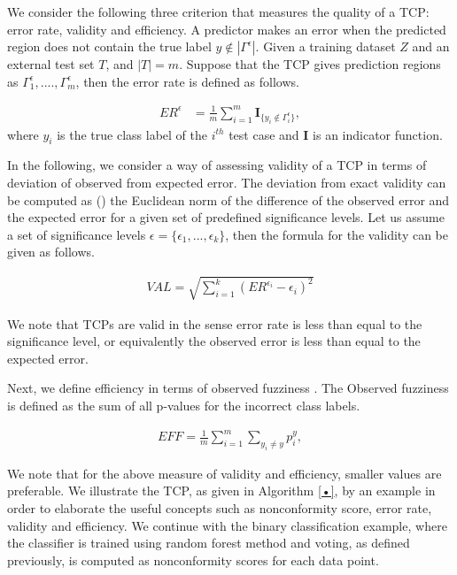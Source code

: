 \documentclass[main]{subfiles}
\begin{document}
We consider the following three criterion that measures the quality of a TCP: error rate,
validity and efficiency. A predictor makes an error when the predicted region does not contain the true label $ y \not\in |\Gamma^{\epsilon}|$. Given a training dataset $Z$ and an external test set $T$,  and $|T| = m$. Suppose that the TCP gives prediction regions as $\Gamma_1^{\epsilon}, ...., \Gamma_m^{\epsilon}$, then the error rate is defined as follows.

\begin{definition}
\begin{align} \label{eq:errorRate}
		ER^{\epsilon} &= \frac{ 1}{m} \sum\limits_{i=1}^{m} \textbf{I}_{ \{y_i \not\in \Gamma_i^{\epsilon} \} },		
\end{align}	
where $y_i$ is the true class label of the $i^{th}$ test case and $\textbf{I}$ is an indicator function. 	
\end{definition}
In the following, we consider a way of assessing validity of a TCP in terms of deviation of observed from expected error. The deviation from exact validity can be computed as (\cite{carlsson2017comparing}) the Euclidean norm of the difference of the observed error and the expected error for a given set of predefined significance levels. Let us assume a set of significance levels $\epsilon = \{ \epsilon_1, ..., \epsilon_k \}$, then the formula for the validity can be given as follows.

\begin{definition}[Validity]
\begin{align} \label{eq:validity}
		VAL = \sqrt{ \sum\limits_{i=1}^{k} (ER^{\epsilon_i} -\epsilon_i)^2 }
\end{align}	 
\end{definition}
We note that TCPs are valid in the sense error rate is less than equal to the significance level, or equivalently the observed error is less than equal to the expected error.

Next, we define efficiency in terms of observed fuzziness \cite{vovk2016criteria}. The Observed fuzziness is defined as the sum of all p-values for the incorrect class labels. %
\begin{definition}[Efficiency]
\begin{align} \label{eq:efficiency}
	EFF =\frac{ 1}{m} \sum\limits_{i=1}^{m} \sum\limits_{y_i \neq y }  p_i^y,		
\end{align}
\end{definition}
We note that for the above measure of validity and efficiency, smaller
values are preferable. We illustrate the TCP, as given in Algorithm \ref{•}, by an example in order to elaborate the useful concepts such as nonconformity score, error rate, validity and efficiency. We continue with the binary classification example, where the classifier 
is trained using  random forest method \cite{Breiman} and voting, as defined previously, is computed as nonconformity scores for each data point.
\end{document}
